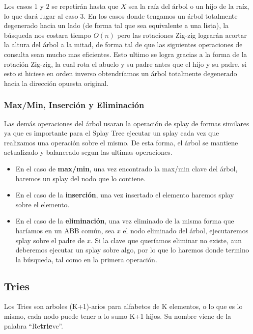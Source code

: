 Los casos $1$ y $2$ se repetir\'an hasta que $X$ sea la ra\'iz del \'arbol o un hijo de la ra\'iz, lo que dar\'a lugar al caso $3$. En los casos donde tengamos un \'arbol totalmente degenerado hacia un lado (de forma tal que sea equivalente a una lista), la b\'usqueda nos costara tiempo $O(n)$ pero las rotaciones Zig-zig lograr\'an acortar la altura del \'arbol a la mitad, de forma tal de que las siguientes operaciones de consulta sean mucho mas eficientes. Esto ultimo se logra gracias a la forma de la rotaci\'on Zig-zig, la cual rota el abuelo y su padre antes que el hijo y su padre, si esto si hiciese en orden inverso obtendr\'iamos un \'arbol totalmente degenerado hacia la direcci\'on opuesta original. 

\subsubsection{Max/Min, Inserci\'on y Eliminaci\'on}

Las dem\'as operaciones del \'arbol usaran la operaci\'on de splay de formas similares ya que es importante para el Splay Tree ejecutar un splay cada vez que realizamos una operaci\'on sobre el mismo. De esta forma, el \'arbol se mantiene actualizado y balanceado segun las ultimas operaciones.

\begin{itemize}
 \item En el caso de \textbf{max/min}, una vez encontrado la max/min clave del \'arbol, haremos un splay del nodo que lo contiene.
 \item En el caso de la \textbf{inserci\'on}, una vez insertado el elemento haremos splay sobre el elemento.
 \item En el caso de la \textbf{eliminaci\'on}, una vez eliminado de la misma forma que har\'iamos en un ABB com\'un, sea $x$ el nodo eliminado del \'arbol, ejecutaremos splay sobre el padre de $x$. Si la clave que quer\'iamos eliminar no existe, aun deberemos ejecutar un splay sobre algo, por lo que lo haremos donde termino la b\'usqueda, tal como en la primera operaci\'on.
\end{itemize}

\subsection{Tries}
Los Tries son arboles (K+1)-arios para alfabetos de K elementos, o lo que es lo mismo, cada nodo puede tener a lo sumo K+1 hijos. Su nombre viene de la palabra ``Re\textbf{trie}ve''.


